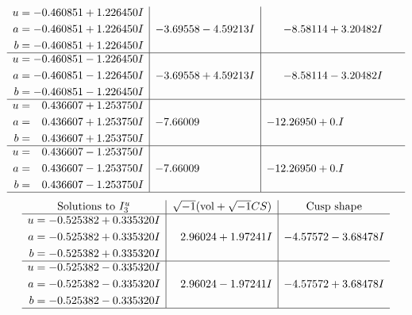 \documentclass[1p]{elsarticle_modified}
\theoremstyle{definition}
\newcommand{\I}{\sqrt{-1}}
\begin{document}
$$\begin{array}{c|c|c}
\begin{aligned}
u &= -0.460851 + 1.226450 I \\
a &= -0.460851 + 1.226450 I \\
b &= -0.460851 + 1.226450 I\end{aligned}
 & -3.69558 - 4.59213 I & -8.58114 + 3.20482 I \\ \hline\begin{aligned}
u &= -0.460851 - 1.226450 I \\
a &= -0.460851 - 1.226450 I \\
b &= -0.460851 - 1.226450 I\end{aligned}
 & -3.69558 + 4.59213 I & -8.58114 - 3.20482 I \\ \hline\begin{aligned}
u &= \phantom{-}0.436607 + 1.253750 I \\
a &= \phantom{-}0.436607 + 1.253750 I \\
b &= \phantom{-}0.436607 + 1.253750 I\end{aligned}
 & -7.66009\phantom{ +0.000000I} & -12.26950 + 0. I\phantom{ +0.000000I} \\ \hline\begin{aligned}
u &= \phantom{-}0.436607 - 1.253750 I \\
a &= \phantom{-}0.436607 - 1.253750 I \\
b &= \phantom{-}0.436607 - 1.253750 I\end{aligned}
 & -7.66009\phantom{ +0.000000I} & -12.26950 + 0. I\phantom{ +0.000000I}\\
 \hline 
 \end{array}$$\newpage$$\begin{array}{c|c|c}  
\text{Solutions to }I^u_{3}& \I (\text{vol} + \sqrt{-1}CS) & \text{Cusp shape}\\
 \hline 
\begin{aligned}
u &= -0.525382 + 0.335320 I \\
a &= -0.525382 + 0.335320 I \\
b &= -0.525382 + 0.335320 I\end{aligned}
 & \phantom{-}2.96024 + 1.97241 I & -4.57572 - 3.68478 I \\ \hline\begin{aligned}
u &= -0.525382 - 0.335320 I \\
a &= -0.525382 - 0.335320 I \\
b &= -0.525382 - 0.335320 I\end{aligned}
 & \phantom{-}2.96024 - 1.97241 I & -4.57572 + 3.68478 I\\
 \hline 
 \end{array}$$\newpage\newpage\renewcommand{\arraystretch}{1}
\end{document}
